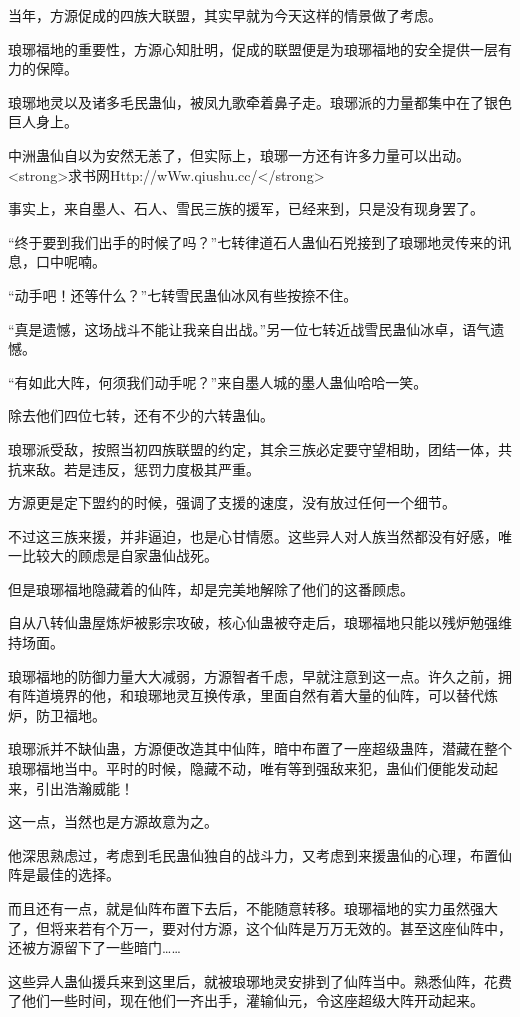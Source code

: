 \begin{this_body}
当年，方源促成的四族大联盟，其实早就为今天这样的情景做了考虑。

琅琊福地的重要性，方源心知肚明，促成的联盟便是为琅琊福地的安全提供一层有力的保障。

琅琊地灵以及诸多毛民蛊仙，被凤九歌牵着鼻子走。琅琊派的力量都集中在了银色巨人身上。

中洲蛊仙自以为安然无恙了，但实际上，琅琊一方还有许多力量可以出动。<strong>求书网Http://wWw.qiushu.cc/</strong>

事实上，来自墨人、石人、雪民三族的援军，已经来到，只是没有现身罢了。

“终于要到我们出手的时候了吗？”七转律道石人蛊仙石兇接到了琅琊地灵传来的讯息，口中呢喃。

“动手吧！还等什么？”七转雪民蛊仙冰风有些按捺不住。

“真是遗憾，这场战斗不能让我亲自出战。”另一位七转近战雪民蛊仙冰卓，语气遗憾。

“有如此大阵，何须我们动手呢？”来自墨人城的墨人蛊仙哈哈一笑。

除去他们四位七转，还有不少的六转蛊仙。

琅琊派受敌，按照当初四族联盟的约定，其余三族必定要守望相助，团结一体，共抗来敌。若是违反，惩罚力度极其严重。

方源更是定下盟约的时候，强调了支援的速度，没有放过任何一个细节。

不过这三族来援，并非逼迫，也是心甘情愿。这些异人对人族当然都没有好感，唯一比较大的顾虑是自家蛊仙战死。

但是琅琊福地隐藏着的仙阵，却是完美地解除了他们的这番顾虑。

自从八转仙蛊屋炼炉被影宗攻破，核心仙蛊被夺走后，琅琊福地只能以残炉勉强维持场面。

琅琊福地的防御力量大大减弱，方源智者千虑，早就注意到这一点。许久之前，拥有阵道境界的他，和琅琊地灵互换传承，里面自然有着大量的仙阵，可以替代炼炉，防卫福地。

琅琊派并不缺仙蛊，方源便改造其中仙阵，暗中布置了一座超级蛊阵，潜藏在整个琅琊福地当中。平时的时候，隐藏不动，唯有等到强敌来犯，蛊仙们便能发动起来，引出浩瀚威能！

这一点，当然也是方源故意为之。

他深思熟虑过，考虑到毛民蛊仙独自的战斗力，又考虑到来援蛊仙的心理，布置仙阵是最佳的选择。

而且还有一点，就是仙阵布置下去后，不能随意转移。琅琊福地的实力虽然强大了，但将来若有个万一，要对付方源，这个仙阵是万万无效的。甚至这座仙阵中，还被方源留下了一些暗门……

这些异人蛊仙援兵来到这里后，就被琅琊地灵安排到了仙阵当中。熟悉仙阵，花费了他们一些时间，现在他们一齐出手，灌输仙元，令这座超级大阵开动起来。


\end{this_body}
